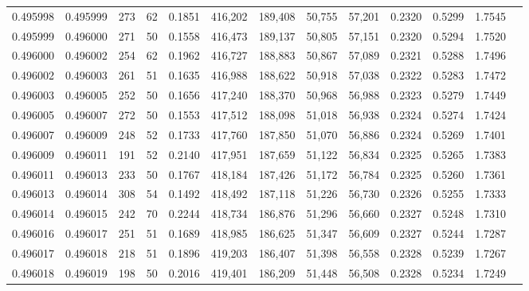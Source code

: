 \begin{tabular}{rrrrrrrrrrrrr}
0.495998 & 0.495999 &   273 &  62 &                                     0.1851 & 416,202 & 189,408 &  50,755 &  57,201 & 0.2320 & 0.5299 & 1.7545 \\
0.495999 & 0.496000 &   271 &  50 &                                     0.1558 & 416,473 & 189,137 &  50,805 &  57,151 & 0.2320 & 0.5294 & 1.7520 \\
0.496000 & 0.496002 &   254 &  62 &                                     0.1962 & 416,727 & 188,883 &  50,867 &  57,089 & 0.2321 & 0.5288 & 1.7496 \\
0.496002 & 0.496003 &   261 &  51 &                                     0.1635 & 416,988 & 188,622 &  50,918 &  57,038 & 0.2322 & 0.5283 & 1.7472 \\
0.496003 & 0.496005 &   252 &  50 &                                     0.1656 & 417,240 & 188,370 &  50,968 &  56,988 & 0.2323 & 0.5279 & 1.7449 \\
0.496005 & 0.496007 &   272 &  50 &                                     0.1553 & 417,512 & 188,098 &  51,018 &  56,938 & 0.2324 & 0.5274 & 1.7424 \\
0.496007 & 0.496009 &   248 &  52 &                                     0.1733 & 417,760 & 187,850 &  51,070 &  56,886 & 0.2324 & 0.5269 & 1.7401 \\
0.496009 & 0.496011 &   191 &  52 &                                     0.2140 & 417,951 & 187,659 &  51,122 &  56,834 & 0.2325 & 0.5265 & 1.7383 \\
0.496011 & 0.496013 &   233 &  50 &                                     0.1767 & 418,184 & 187,426 &  51,172 &  56,784 & 0.2325 & 0.5260 & 1.7361 \\
0.496013 & 0.496014 &   308 &  54 &                                     0.1492 & 418,492 & 187,118 &  51,226 &  56,730 & 0.2326 & 0.5255 & 1.7333 \\
0.496014 & 0.496015 &   242 &  70 &                                     0.2244 & 418,734 & 186,876 &  51,296 &  56,660 & 0.2327 & 0.5248 & 1.7310 \\
0.496016 & 0.496017 &   251 &  51 &                                     0.1689 & 418,985 & 186,625 &  51,347 &  56,609 & 0.2327 & 0.5244 & 1.7287 \\
0.496017 & 0.496018 &   218 &  51 &                                     0.1896 & 419,203 & 186,407 &  51,398 &  56,558 & 0.2328 & 0.5239 & 1.7267 \\
0.496018 & 0.496019 &   198 &  50 &                                     0.2016 & 419,401 & 186,209 &  51,448 &  56,508 & 0.2328 & 0.5234 & 1.7249 \\

\end{tabular}
